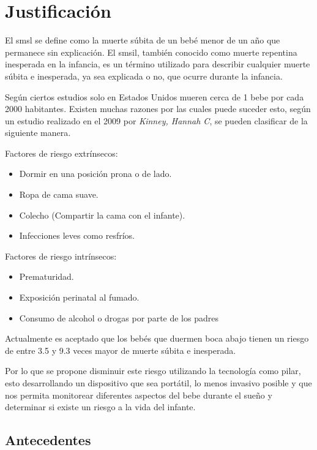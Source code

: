 
%
%
\section{Justificación}

El \acrfull{smsl} se define como la muerte súbita de un bebé menor de un año que permanece sin explicación. El \acrfull{smsil}, también conocido como muerte repentina inesperada en la infancia, es un término utilizado para describir cualquier muerte súbita e inesperada, ya sea explicada o no, que ocurre durante la infancia.

Según ciertos estudios\cite{b1} solo en Estados Unidos mueren cerca de 1 bebe por cada 2000 habitantes.
Existen muchas razones por las cuales puede suceder esto, según un estudio realizado en el 2009 por \emph{Kinney, Hannah C}\cite{b2}, se pueden clasificar de la siguiente manera.

Factores de riesgo extrínsecos:
\begin{itemize}
    \item Dormir en una posición prona o de lado.
    \item Ropa de cama suave.
    \item Colecho (Compartir la cama con el infante).
    \item Infecciones leves como resfríos.
\end{itemize}

Factores de riesgo intrínsecos:
\begin{itemize}
    \item Prematuridad.
    \item Exposición perinatal al fumado.
    \item Consumo de alcohol o drogas por parte de los padres
\end{itemize}

Actualmente es aceptado que los bebés que duermen boca abajo tienen un riesgo de entre 3.5 y 9.3 veces mayor de muerte súbita e inesperada.

Por lo que se propone disminuir este riesgo utilizando la tecnología como pilar, esto desarrollando un dispositivo que sea portátil, lo menos invasivo posible y que nos permita monitorear diferentes aspectos del bebe durante el sueño y determinar si existe un riesgo a la vida del infante.

\subsection{Antecedentes}

